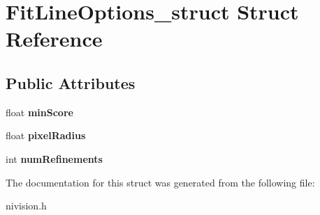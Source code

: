 \hypertarget{structFitLineOptions__struct}{\section{\-Fit\-Line\-Options\-\_\-struct \-Struct \-Reference}
\label{structFitLineOptions__struct}
}
\subsection*{\-Public \-Attributes}
\begin{DoxyCompactItemize}
\item 
\hypertarget{structFitLineOptions__struct_ad67f234d82754ed18966e3328878e378}{float {\bfseries min\-Score}}\label{structFitLineOptions__struct_ad67f234d82754ed18966e3328878e378}

\item 
\hypertarget{structFitLineOptions__struct_a98bf1643e9d88cd762133060d5c874d6}{float {\bfseries pixel\-Radius}}\label{structFitLineOptions__struct_a98bf1643e9d88cd762133060d5c874d6}

\item 
\hypertarget{structFitLineOptions__struct_aef02bd82513aed7d209e0ad9319599c0}{int {\bfseries num\-Refinements}}\label{structFitLineOptions__struct_aef02bd82513aed7d209e0ad9319599c0}

\end{DoxyCompactItemize}


\-The documentation for this struct was generated from the following file\-:\begin{DoxyCompactItemize}
\item 
nivision.\-h\end{DoxyCompactItemize}
